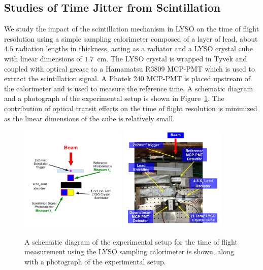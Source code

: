 \documentclass[12pt]{article}
\begin{document}
\subsection{Studies of Time Jitter from Scintillation}

We study the impact of the scintillation mechanism in LYSO
on the time of flight resolution using a simple 
sampling calorimeter composed of a layer of
lead, about $4.5$ radiation lengths in thickness, acting
as a radiator and a LYSO crystal cube with linear dimensions 
of $1.7$~cm. The LYSO crystal is wrapped in Tyvek and  
coupled with optical grease to a Hamamatsu R3809 MCP-PMT
which is used to extract the scintillation signal. 
A Photek 240 MCP-PMT is placed upstream of the calorimeter and 
is used to measure the reference time. A schematic diagram
and a photograph of the experimental setup
is shown in Figure~\ref{fig:LYSOSamplingCaloSetup}. 
The contribution of optical transit effects on the 
time of flight resolution is minimized as the linear
dimensions of the cube is relatively small.

\begin{figure}[h] \centering
\includegraphics[width=0.45\textwidth]{figs/LYSOSamplingCaloSetupSchematic} 
\includegraphics[width=0.45\textwidth]{figs/LYSOSamplingCaloSetupPhoto} 
\caption{ A schematic diagram of the experimental setup for the
time of flight measurement using the LYSO sampling calorimeter
is shown, along with a photograph of the experimental setup. } 
\label{fig:LYSOSamplingCaloSetup}
\end{figure}
\end{document}
